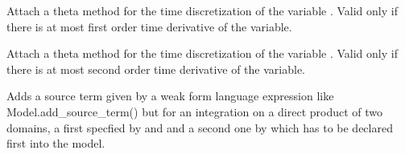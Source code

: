 \documentclass[a4paper,11pt,english]{sphinxmanual}
\begin{document}
\begin{fulllineitems}

\begin{fulllineitems}
\label{\detokenize{python/cmdref_Model:getfem.Model.add_theta_method_for_first_order}}
Attach a theta method for the time discretization of the variable
. Valid only if there is at most first order time derivative
of the variable.

\end{fulllineitems}


\begin{fulllineitems}
\label{\detokenize{python/cmdref_Model:getfem.Model.add_theta_method_for_second_order}}
Attach a theta method for the time discretization of the variable
. Valid only if there is at most second order time derivative
of the variable.

\end{fulllineitems}


\begin{fulllineitems}
\label{\detokenize{python/cmdref_Model:getfem.Model.add_twodomain_source_term}}
Adds a source term given by a weak form language expression like
Model.add\_source\_term() but for an integration on a direct
product of two domains, a first specfied by  and 
and a second one by  which has to be declared
first into the model.

\end{fulllineitems}


\end{fulllineitems}
\end{document}

